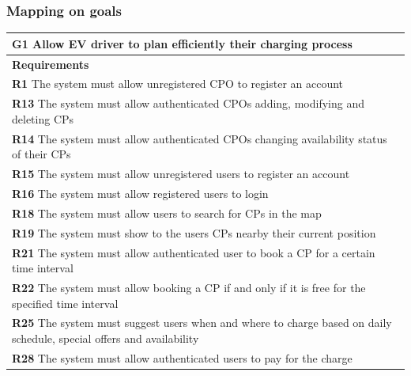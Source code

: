 \subsubsection{Mapping on goals}
\begin{table}[H]
    \begin{tabularx}{\textwidth}{X}
        \toprule
        \textbf{G1} Allow EV driver to plan efficiently their charging process                                                       \\ \midrule
        \textbf{Requirements}                                                                                                        \\ \midrule
        \textbf{R1} The system must allow unregistered CPO to register an account                                                    \\
        \textbf{R13} The system must allow authenticated CPOs adding, modifying and deleting CPs                                     \\
        \textbf{R14} The system must allow authenticated CPOs changing availability status of their CPs                              \\
        \textbf{R15} The system must allow unregistered users to register an account                                                 \\
        \textbf{R16} The system must allow registered users to login                                                                 \\
        \textbf{R18} The system must allow users to search for CPs in the map                                                        \\
        \textbf{R19} The system must show to the users CPs nearby their current position                                             \\
        \textbf{R21} The system must allow authenticated user to book a CP for a certain time interval                               \\
        \textbf{R22} The system must allow booking a CP if and only if it is free for the specified time interval                    \\
        \textbf{R25} The system must suggest users when and where to charge based on daily schedule, special offers and availability \\
        \textbf{R28} The system must allow authenticated users to pay for the charge                                                 \\

\end{tabularx}
\end{table}
